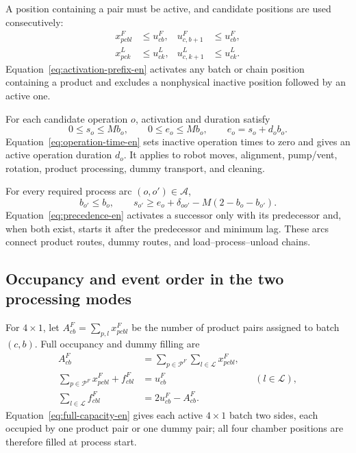 \documentclass[final,5p,times,twocolumn]{elsarticle}
\begin{document}
A position containing a pair must be active, and candidate positions are used consecutively:
\begin{equation}
\begin{aligned}
x^F_{pcbl}&\le u^F_{cb}, &u^F_{c,b+1}&\le u^F_{cb},\\
x^L_{pck}&\le u^L_{ck}, &u^L_{c,k+1}&\le u^L_{ck}.
\end{aligned}
\label{eq:activation-prefix-en}
\end{equation}
Equation~\eqref{eq:activation-prefix-en} activates any batch or chain position containing a product and excludes a nonphysical inactive position followed by an active one.

For each candidate operation $o$, activation and duration satisfy
\begin{equation}
0\le s_o\le Mb_o,\qquad
0\le e_o\le Mb_o,\qquad
e_o=s_o+d_ob_o.
\label{eq:operation-time-en}
\end{equation}
Equation~\eqref{eq:operation-time-en} sets inactive operation times to zero and gives an active operation duration $d_o$. It applies to robot moves, alignment, pump/vent, rotation, product processing, dummy transport, and cleaning.

For every required process arc $(o,o')\in\mathcal A$,
\begin{equation}
b_{o'}\le b_o,\qquad
s_{o'}\ge e_o+\delta_{oo'}-M(2-b_o-b_{o'}).
\label{eq:precedence-en}
\end{equation}
Equation~\eqref{eq:precedence-en} activates a successor only with its predecessor and, when both exist, starts it after the predecessor and minimum lag. These arcs connect product routes, dummy routes, and load--process--unload chains.

\subsection{Occupancy and event order in the two processing modes}

For $4\times1$, let $A^F_{cb}=\sum_{p,l}x^F_{pcbl}$ be the number of product pairs assigned to batch $(c,b)$. Full occupancy and dummy filling are
\begin{equation}
\begin{aligned}
A^F_{cb}&=\sum_{p\in\mathcal P^F}\sum_{l\in\mathcal L}x^F_{pcbl},\\
\sum_{p\in\mathcal P^F}x^F_{pcbl}+f^F_{cbl}&=u^F_{cb}
&& (l\in\mathcal L),\\
\sum_{l\in\mathcal L}f^F_{cbl}&=2u^F_{cb}-A^F_{cb}.
\end{aligned}
\label{eq:full-capacity-en}
\end{equation}
Equation~\eqref{eq:full-capacity-en} gives each active $4\times1$ batch two sides, each occupied by one product pair or one dummy pair; all four chamber positions are therefore filled at process start.
\end{document}
